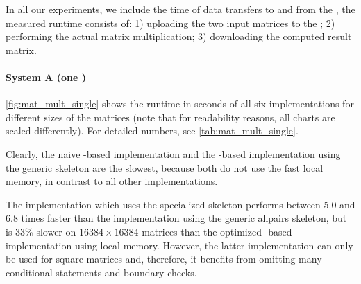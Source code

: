 In all our experiments, we include the time of data transfers to and from the \GPU, \ie the measured runtime consists of:
1) uploading the two input matrices to the \GPU;
2) performing the actual matrix multiplication;
3) downloading the computed result matrix.

\paragraph{System A (one \GPU)}
\autoref{fig:mat_mult_single} shows the runtime in seconds of all six implementations for different sizes of the matrices (note that for readability reasons, all charts are scaled differently).
For detailed numbers, see \autoref{tab:mat_mult_single}.

Clearly, the naive \OpenCL-based implementation and the \SkelCL-based implementation using the generic \allpairs skeleton are the slowest, because both do not use the fast \GPU local memory, in contrast to all other implementations.

The implementation which uses the specialized \allpairs skeleton performs between 5.0 and 6.8 times faster than the implementation using the generic allpairs skeleton, but is 33\% slower on $16384\times 16384$ matrices than the optimized \OpenCL-based implementation using local memory.
However, the latter implementation can only be used for square matrices and, therefore, it benefits from omitting many conditional statements and boundary checks.

